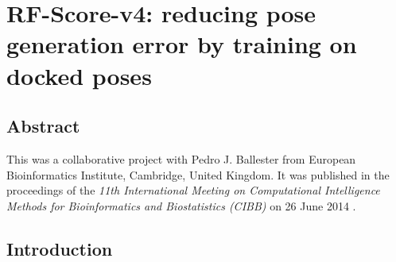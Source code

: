 \chapter{RF-Score-v4: reducing pose generation error by training on docked poses}

\section{Abstract}

This was a collaborative project with Pedro J. Ballester from European Bioinformatics Institute, Cambridge, United Kingdom. It was published in the proceedings of the \textit{11th International Meeting on Computational Intelligence Methods for Bioinformatics and Biostatistics (CIBB)} on 26 June 2014 \citep{1434}.

\section{Introduction}

\chapterend
